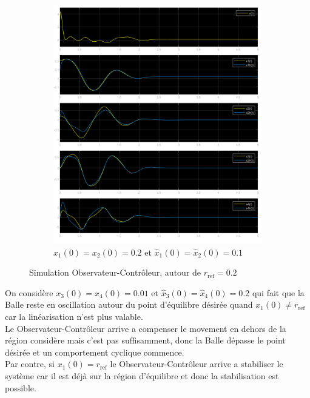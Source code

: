 \documentclass[class=article, crop=false]{standalone}
\begin{document}
\begin{resolution}
\begin{figure}[H]
\begin{subfigure}[b]{0.475\textwidth}
            \includegraphics[width=\textwidth]{../images/m5_r0.02_s0.2_o0.1.png}
            \caption{$x_1(0) = x_2(0) = 0.2$ et $\hat{x}_1(0) = \hat{x}_2(0) = 0.1$}
        \end{subfigure}
        \caption{Simulation Observateur-Contrôleur, autour de $r_{\text{ref}} = 0.2$}
    \end{figure}
    On considère $x_3(0) = x_4(0) = 0.01$ et $\hat{x}_3(0) = \hat{x}_4(0) = 0.2$ qui fait que la Balle reste en oscillation autour du point d'équilibre désirée quand $x_1(0) \neq r_{\text{ref}}$ car la linéarisation n'est plus valable.\\
    
    Le Observateur-Contrôleur arrive a compenser le movement en dehors de la région considère mais c'est pas suffisamment, donc la Balle dépasse le point désirée et un comportement cyclique commence.\\

    Par contre, si $x_1(0) = r_{\text{ref}}$ le Observateur-Contrôleur arrive a stabiliser le système car il est déjà sur la région d'équilibre et donc la stabilisation est possible.
\end{resolution}
\end{document}
